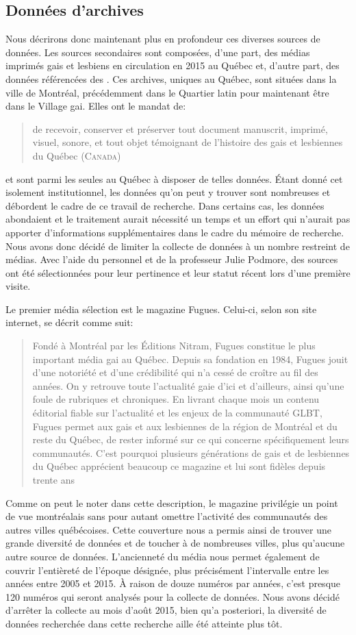 \subsection{Données d'archives}
\label{sub:donn_es_d_archives}
Nous décrirons donc maintenant plus en profondeur ces diverses sources de données. 
Les sources secondaires sont composées, d'une part, des médias imprimés gais et lesbiens en circulation en 2015 au Québec et, d'autre part, des données référencées des \agq{}. 
Ces archives, uniques au Québec, sont situées dans la ville de Montréal, précédemment dans le Quartier latin pour maintenant être dans le Village gai.
Elles ont le mandat de: \blockquote[{\cite{LAGQ2014}}][.]{\textelp{} de recevoir,   conserver et préserver tout document manuscrit, imprimé, visuel, sonore, et   tout objet témoignant de l'histoire des gais et lesbiennes du Québec   (\textsc{Canada})} et sont parmi les seules au Québec à disposer de telles données. 
Étant donné cet isolement institutionnel, les données qu'on peut y trouver sont nombreuses et débordent le cadre de ce travail de recherche. 
Dans certains cas, les données abondaient et le traitement aurait nécessité un temps et un effort qui n'aurait pas apporter d'informations supplémentaires dans le cadre du mémoire de recherche. 
Nous avons donc décidé de limiter la collecte de données à un nombre restreint de médias. 
Avec l'aide du personnel et de la professeur Julie Podmore, des sources ont été sélectionnées pour leur pertinence et leur statut récent lors d'une première visite.

Le premier média sélection est le magazine Fugues. 
Celui-ci, selon son site internet, se décrit comme suit: \blockquote[{\cite{LesNitram2015}}][.]{
  Fondé à Montréal par les Éditions Nitram, Fugues constitue le plus important média gai au Québec. 
Depuis sa fondation en 1984, Fugues jouit d’une notoriété et d’une crédibilité qui n’a cessé de croître au fil des années. 
On y retrouve toute l’actualité gaie d’ici et d’ailleurs, ainsi qu'une foule de rubriques et chroniques. 
En livrant chaque mois un contenu éditorial fiable sur l’actualité et les enjeux de la communauté GLBT, Fugues permet aux gais et aux lesbiennes de la région de Montréal et du reste du Québec, de rester informé sur ce qui concerne spécifiquement leurs communautés. 
C’est pourquoi plusieurs générations de gais et de lesbiennes du Québec apprécient beaucoup ce magazine et lui sont fidèles depuis trente ans} 
Comme on peut le noter dans cette description, le magazine privilégie un point de vue montréalais sans pour autant omettre l'activité des communautés \lgbt{} des autres  villes québécoises. 
Cette couverture nous a permis ainsi de trouver une grande diversité de données et de toucher à de nombreuses villes, plus qu'aucune autre source de données. 
L'ancienneté du média nous permet également de couvrir l'entièreté de l'époque désignée, plus précisément l'intervalle entre les années entre 2005 et 2015. 
À raison de douze numéros par années, c'est presque 120 numéros qui seront analysés pour la collecte de données. 
Nous avons décidé d'arrêter la collecte au mois d'août 2015, bien qu'a posteriori, la diversité de données recherchée dans cette recherche aille été atteinte plus tôt.

